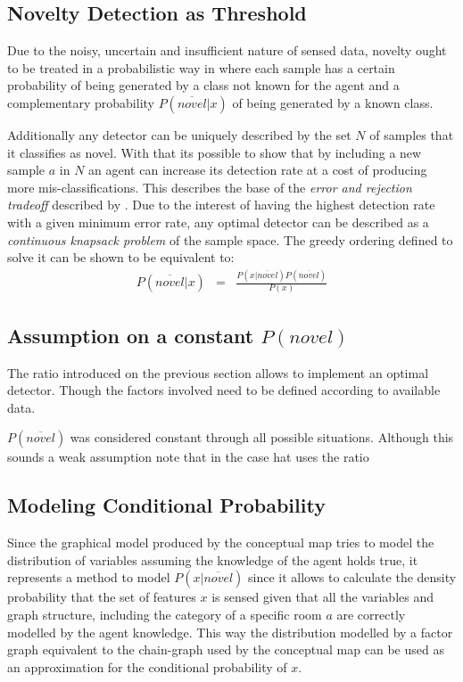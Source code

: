 \documentclass[9pt,a4paper]{extarticle}
\begin{document}
\begin{multicols}{2}
\subsection{Novelty Detection as Threshold}
Due to the noisy, uncertain and insufficient nature of sensed data, novelty ought to be
treated in a probabilistic way in where each sample has a certain probability
of being generated by a class not known for the agent and a complementary probability $P(\overline{novel}|x)$
of being generated by a known class.

Additionally any detector can be uniquely described by the set $N$ of samples that it
classifies as novel. With that its possible to show that by including a new sample $a$ in $N$ an agent
can increase its detection rate at a cost of producing more mis-classifications.
This describes the base of the \emph{error and rejection tradeoff} described by \cite{chow1970optimum}.
Due to the interest of having the highest detection rate with a given minimum error rate, any optimal
detector can be described as a \emph{continuous knapsack problem} of the sample space.
The greedy ordering defined to solve it can be shown to be equivalent to:
\begin{eqnarray}
P(\overline{novel}|x) &=& \frac{P(x|\overline{novel})P(\overline{novel})}{P(x)}
\end{eqnarray}

\subsection{Assumption on a constant $P(novel)$}
The ratio introduced on the previous section allows to implement an optimal detector.
Though the factors involved need to be defined according to available data.

$P(\overline{novel})$ was considered constant through all possible situations. Although this
sounds a weak assumption note that in the case hat uses the ratio

\subsection{Modeling Conditional Probability}
Since the graphical model produced by the conceptual map tries to model the distribution of
variables assuming the knowledge of the agent holds true, it represents a method to model
$P(x|\overline{novel})$ since it allows to calculate the density probability that the set of features $x$ is
sensed given that all the variables and graph structure, including the category of
a specific room $a$ are correctly modelled by the agent knowledge.
This way the distribution modelled by a factor graph equivalent to the chain-graph used by
the conceptual map can be used as an approximation for the conditional probability of $x$.


\end{multicols}
\end{document}
